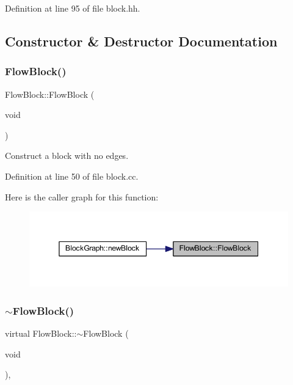 Definition at line 95 of file block.\+hh.



\subsection{Constructor \& Destructor Documentation}
\mbox{\label{class_flow_block_a1322971561fc70b9f0a9a9a7e05b6c7c}} 
\subsubsection{\texorpdfstring{FlowBlock()}{FlowBlock()}}
{\footnotesize\ttfamily Flow\+Block\+::\+Flow\+Block (\begin{DoxyParamCaption}\item[{void}]{ }\end{DoxyParamCaption})}



Construct a block with no edges. 



Definition at line 50 of file block.\+cc.

Here is the caller graph for this function\+:
\nopagebreak
\begin{figure}[H]
\begin{center}
\leavevmode
\includegraphics[width=345pt]{class_flow_block_a1322971561fc70b9f0a9a9a7e05b6c7c_icgraph}
\end{center}
\end{figure}
\mbox{\label{class_flow_block_a98eda86da929807f1e46575375cffd46}} 
\subsubsection{\texorpdfstring{$\sim$FlowBlock()}{~FlowBlock()}}
{\footnotesize\ttfamily virtual Flow\+Block\+::$\sim$\+Flow\+Block (\begin{DoxyParamCaption}\item[{void}]{ }\end{DoxyParamCaption})\hspace{0.3cm}{\ttfamily [inline]}, {\ttfamily [virtual]}}



